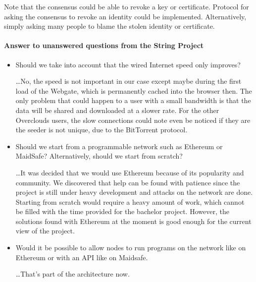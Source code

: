 Note that the consensus could be able to revoke a key or certificate. Protocol for asking the consensus to revoke an identity could be implemented. Alternatively, simply asking many people to blame the stolen identity or certificate.

\paragraph{Answer to unanswered questions from the String Project}
\begin{itemize}
\item Should we take into account that the wired Internet speed only improves?

\dots No, the speed is not important in our case except maybe during the first load of the Webgate, which is permanently cached into the browser then. The only problem that could happen to a user with a small bandwidth is that the data will be shared and downloaded at a slower rate. For the other Overclouds users, the slow connections could note even be noticed if they are the seeder is not unique, due to the BitTorrent protocol.

\item Should we start from a programmable network such as Ethereum or MaidSafe? Alternatively, should we start from scratch?

\dots It was decided that we would use Ethereum because of its popularity and community. We discovered that help can be found with patience since the project is still under heavy development and attacks on the network are done. Starting from scratch would require a heavy amount of work, which cannot be filled with the time provided for the bachelor project. However, the solutions found with Ethereum at the moment is good enough for the current view of the project. 

\item Would it be possible to allow nodes to run programs on the network like on Ethereum or with an API like on Maidsafe\cite{MaidSafe2014MaidSafe.netCommunity}.

\dots That's part of the architecture now.
\end{itemize}



